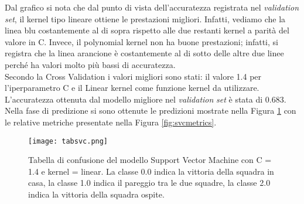 Dal grafico si nota che dal punto di vista dell'accuratezza registrata nel \emph{validation} \emph{set}, il kernel tipo lineare ottiene le prestazioni migliori. Infatti, vediamo che la linea blu costantemente al di sopra rispetto alle due restanti kernel a parità del valore in C. Invece, il polynomial kernel non ha buone prestazioni; infatti, si registra che la linea arancione è costantemente al di sotto delle altre due linee perché ha valori molto più bassi di accuratezza.\\
Secondo la Cross Validation i valori migliori sono stati: il valore 1.4 per l'iperparametro \textsf{C} e il Linear kernel come funzione \textsf{kernel} da utilizzare.
L'accuratezza ottenuta dal modello migliore nel \emph{validation} \emph{set} è stata di 0.683.\\ Nella fase di predizione si sono ottenute le predizioni mostrate nella Figura \ref{fig:tabsvc} con le relative metriche presentate nella Figura \ref{fig:svcmetrics}.
\begin{figure}[]
	\begin{center}
		\texttt{[image: tabsvc.png]}
		\caption{Tabella di confusione del modello Support Vector Machine con \textsf{C} = 1.4 e \textsf{kernel} = linear. La classe 0.0 indica la vittoria della squadra in casa, la classe 1.0 indica il pareggio tra le due squadre, la classe 2.0 indica la vittoria della squadra ospite.
		} 
		\label{fig:tabsvc}
	\end{center}
\end{figure}

